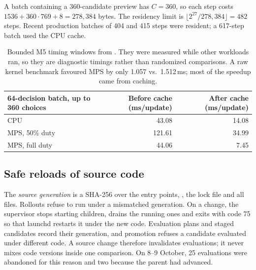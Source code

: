 \begin{example}
A batch containing a 360-candidate preview has $C=360$, so each step costs
$1536+360\cdot769+8=278{,}384$ bytes. The residency limit is
$\lfloor2^{27}/278{,}384\rfloor=482$ steps. Recent production batches of 404
and 415 steps were resident; a 617-step batch used the CPU cache.
\end{example}

\begin{table}[htbp]
\centering\small
\begin{tabular}{lrr}
\toprule
64-decision batch, up to 360 choices & Before cache (ms/update) & After cache (ms/update) \\
\midrule
CPU & 43.08 & 14.08 \\
MPS, 50\% duty & 121.61 & 34.99 \\
MPS, full duty & 44.06 & 7.45 \\
\bottomrule
\end{tabular}
\caption{Bounded M5 timing windows from .
They were measured while other workloads ran, so they are diagnostic timings
rather than randomized comparisons. A raw kernel benchmark favoured MPS by
only 1.057 vs.\ 1.512\,ms; most of the speedup came from caching.}
\label{tab:bench}
\end{table}

\subsection{Safe reloads of source code}
The \emph{source generation} is a SHA-256 over the entry points,
, the lock file and all  files. Rollouts
refuse to run under a mismatched generation. On a change, the supervisor stops
starting children, drains the running ones and exits with code 75 so that
launchd restarts it under the new code. Evaluation plans and staged candidates
record their generation, and promotion refuses a candidate evaluated under
different code. A source change therefore invalidates evaluations; it never
mixes code versions inside one comparison. On 8--9 October, 25 evaluations
were abandoned for this reason and two because the parent had advanced.


